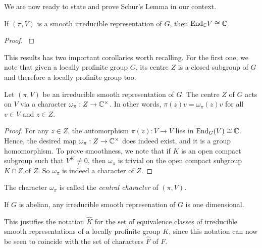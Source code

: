 We are now ready to state and prove Schur's Lemma in our context.

\begin{thm}\label{thm:schur}
    If $(\pi,V)$ is a smooth irreducible representation of $G$, then $\mathrm{End}_{\mathbb{C}}V\cong \mathbb{C}$.
\end{thm}
\begin{proof}
    \cite[2.6 Schur's Lemma]{BH1}
\end{proof}

This results has two important corollaries worth recalling. For the first one, we note that given a locally profinite group $G$, its centre $Z$ is a closed subgroup of $G$ and therefore a locally profinite group too.

\begin{cor}\label{cor:centralchar}
    Let $(\pi,V)$ be an irreducible smooth representation of $G$. The centre $Z$ of $G$ acts on $V$ via a character $\omega_{\pi}:Z\to\mathbb{C}^{\times}$. In other words, $\pi(z)v=\omega_{\pi}(z)v$ for all $v\in V$ and $z\in Z$.
\end{cor}

\begin{proof}
    For any $z\in Z$, the automorphism $\pi(z):V\to V$ lies in $\mathrm{End}_G(V)\cong\mathbb{C}$. Hence, the desired map $\omega_{\pi}:Z\to\mathbb{C}^{\times}$ does indeed exist, and it is a group homomorphism. To prove smoothness, we note that if $K$ is an open compact subgroup such that $V^K\neq 0$, then $\omega_{\pi}$ is trivial on the open compact subgroup $K\cap Z$ of $Z$. So $\omega_{\pi}$ is indeed a character of $Z$.
\end{proof}

The character $\omega_{\pi}$ is called the \textit{central character} of $(\pi,V)$.

\begin{cor}
    If $G$ is abelian, any irreducible smooth represenation of $G$ is one dimensional.
\end{cor}

This justifies the notation $\hat{K}$ for the set of equivalence classes of irreducible smooth representations of a locally profinite group $K$, since this notation can now be seen to coincide with the set of characters $\hat{F}$ of $F$.